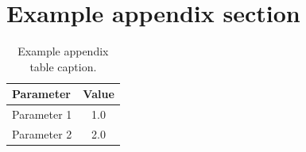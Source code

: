 \lipsum[1]

\section{Example appendix section}
\lipsum[2]

\begin{table}[htbp]
  \centering
  \caption{Example appendix table caption.}
  \begin{tabular}{lc}
    \hline
    Parameter & Value \\
    \hline
    Parameter 1 & 1.0 \\
    Parameter 2 & 2.0 \\
    \hline
  \end{tabular}
\end{table}
